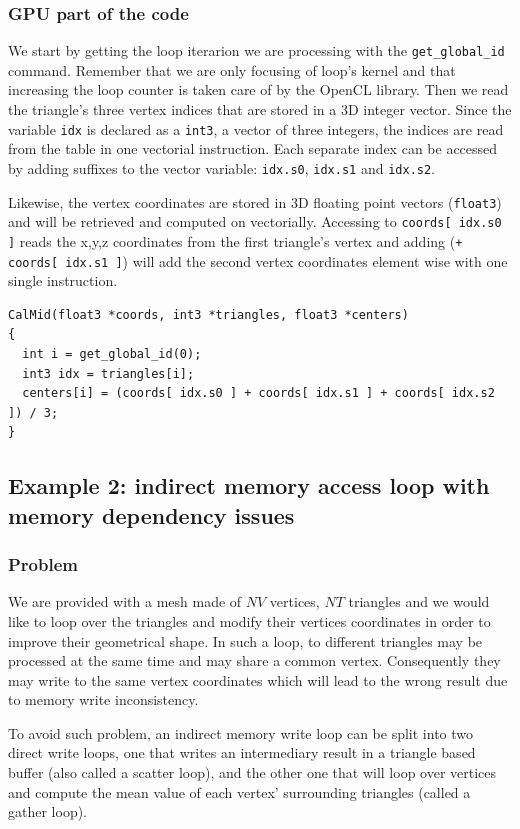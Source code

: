 \documentclass[a4paper,12pt]{article}
\begin{document}
\subsubsection{GPU part of the code}
We start by getting the loop iterarion we are processing with the {\tt get\_global\_id} command. Remember that we are only focusing of loop's kernel and that increasing the loop counter is taken care of by the OpenCL library.
Then we read the triangle's three vertex indices that are stored in a 3D integer vector. Since the variable {\tt idx} is declared as a {\tt int3}, a vector of three integers, the indices are read from the table in one vectorial instruction. Each separate index can be accessed by adding suffixes to the vector variable: {\tt idx.s0}, {\tt idx.s1} and {\tt idx.s2}.

Likewise, the vertex coordinates are stored in 3D floating point vectors ({\tt float3}) and will be retrieved and computed on vectorially. Accessing to {\tt coords[ idx.s0 ]} reads the x,y,z coordinates from the first triangle's vertex and adding 
({\tt + coords[ idx.s1 ]}) will add the second vertex coordinates element wise with one single instruction.

\begin{tt}
\begin{verbatim}
CalMid(float3 *coords, int3 *triangles, float3 *centers)
{
  int i = get_global_id(0);
  int3 idx = triangles[i];
  centers[i] = (coords[ idx.s0 ] + coords[ idx.s1 ] + coords[ idx.s2 ]) / 3;
}
\end{verbatim}
\end{tt}
\normalfont


\subsection{Example 2: indirect memory access loop with memory dependency issues}
\label{ex2}
\subsubsection{Problem}
We are provided with a mesh made of $NV$ vertices, $NT$ triangles and we would like to loop over the triangles and modify their vertices coordinates in order to improve their geometrical shape. In such a loop, to different triangles may be processed at the same time and may share a common vertex. Consequently they may write to the same vertex coordinates which will lead to the wrong result due to memory write inconsistency.

To avoid such problem, an indirect memory write loop can be split into two direct write loops, one that writes an intermediary result in a triangle based buffer (also called a scatter loop), and the other one that will loop over vertices and compute the mean value of each vertex' surrounding triangles (called a gather loop).
\end{document}
